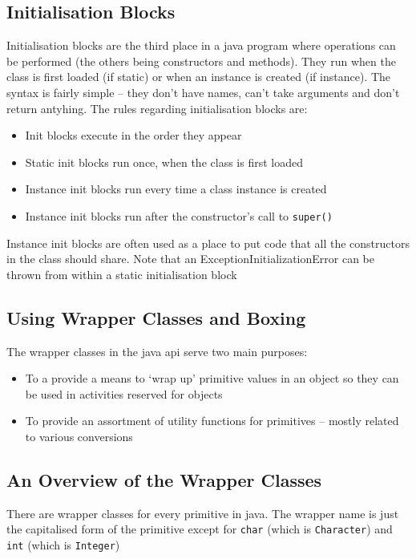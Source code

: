 \subsection{Initialisation Blocks}
Initialisation blocks are the third place in a java program where operations 
can be performed (the others being constructors and methods). They run when the 
class is first loaded (if static) or when an instance is created (if instance).  
The syntax is fairly simple -- they don't have names, can't take arguments and 
don't return antyhing. The rules regarding initialisation blocks are:
\begin{itemize}
    \item Init blocks execute in the order they appear
    \item Static init blocks run once, when the class is first loaded
    \item Instance init blocks run every time a class instance is created
    \item Instance init blocks run after the constructor's call to 
    \verb#super()#
\end{itemize}
Instance init blocks are often used as a place to put code that all the 
constructors in the class should share. Note that an 
ExceptionInitializationError can be thrown from within a static initialisation 
block

\subsection{Using Wrapper Classes and Boxing}
The wrapper classes in the java api serve two main purposes:
\begin{itemize}
    \item To a provide a means to `wrap up' primitive values in an object so 
    they can be used in activities reserved for objects
    \item To provide an assortment of utility functions for primitives -- 
    mostly related to various conversions
\end{itemize}

\subsection{An Overview of the Wrapper Classes}
There are wrapper classes for every primitive in java. The wrapper name is just 
the capitalised form of the primitive except for \verb#char# (which is 
\verb#Character#) and \verb#int# (which is \verb#Integer#)

